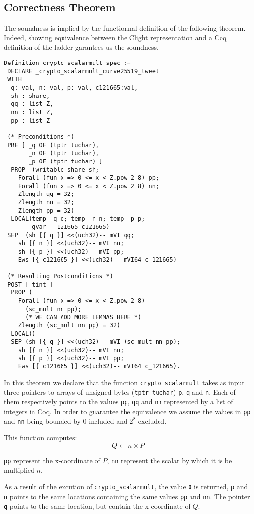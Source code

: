 \subsection{Correctness Theorem}

The soundness is implied by the functionnal definition of the following theorem.
Indeed, showing equivalence between the Clight representation and a Coq
definition of the ladder garantees us the soundness.

\begin{lstlisting}
Definition crypto_scalarmult_spec :=
 DECLARE _crypto_scalarmult_curve25519_tweet
 WITH
  q: val, n: val, p: val, c121665:val,
  sh : share,
  qq : list Z,
  nn : list Z,
  pp : list Z

 (* Preconditions *)
 PRE [ _q OF (tptr tuchar),
       _n OF (tptr tuchar),
       _p OF (tptr tuchar) ]
  PROP  (writable_share sh;
    Forall (fun x => 0 <= x < Z.pow 2 8) pp;
    Forall (fun x => 0 <= x < Z.pow 2 8) nn;
    Zlength qq = 32;
    Zlength nn = 32;
    Zlength pp = 32)
  LOCAL(temp _q q; temp _n n; temp _p p;
        gvar __121665 c121665)
 SEP  (sh [{ q }] <<(uch32)-- mVI qq;
    sh [{ n }] <<(uch32)-- mVI nn;
    sh [{ p }] <<(uch32)-- mVI pp;
    Ews [{ c121665 }] <<(uch32)-- mVI64 c_121665)

 (* Resulting Postconditions *)
 POST [ tint ]
  PROP (
    Forall (fun x => 0 <= x < Z.pow 2 8)
      (sc_mult nn pp);
      (* WE CAN ADD MORE LEMMAS HERE *)
    Zlength (sc_mult nn pp) = 32)
  LOCAL()
  SEP (sh [{ q }] <<(uch32)-- mVI (sc_mult nn pp);
    sh [{ n }] <<(uch32)-- mVI nn;
    sh [{ p }] <<(uch32)-- mVI pp;
    Ews [{ c121665 }] <<(uch32)-- mVI64 c_121665).
\end{lstlisting}

In this theorem we declare that the function \texttt{crypto_scalarmult} takes as
input three pointers to arrays of unsigned bytes (\texttt{tptr tuchar}) \texttt{p},
\texttt{q} and \texttt{n}.
Each of them respectively points to the values \texttt{pp},  \texttt{qq} and  \texttt{nn}
represented by a list of integers in Coq. In order to guarantee the equivalence
we assume the values in \texttt{pp} and \texttt{nn} being bounded by $0$ included
and $2^8$ excluded.

This function computes: $$Q \leftarrow n \times P$$

\texttt{pp} represent the x-coordinate of $P$, \texttt{nn} represent the
scalar by which it is be multiplied $n$.

As a result of the excution of \texttt{crypto_scalarmult}, the value \texttt{0} is returned,
\texttt{p} and \texttt{n} points to the same locations containing the same values \texttt{pp} and \texttt{nn}.
The pointer \texttt{q} points to the same location, but contain the x coordinate of $Q$.
